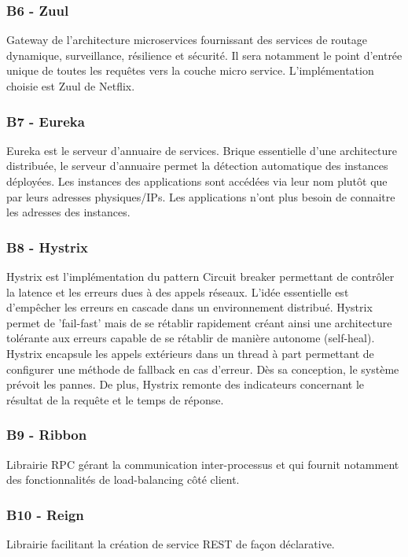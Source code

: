 	\subsubsection{B6 - Zuul}
	Gateway de l’architecture microservices fournissant des services de routage dynamique, surveillance, résilience et sécurité. Il sera notamment le point d’entrée unique de toutes les requêtes vers la couche micro service. L’implémentation choisie est Zuul de Netflix.
	
	\subsubsection{B7 - Eureka}
	Eureka est le serveur d’annuaire de services. Brique essentielle d'une architecture distribuée, le serveur d'annuaire permet la détection automatique des instances déployées. Les instances des applications sont accédées via leur nom plutôt que par leurs adresses physiques/IPs. Les applications n'ont plus besoin de connaitre les adresses des instances.
	
	\subsubsection{B8 - Hystrix}
	Hystrix est l'implémentation du pattern Circuit breaker permettant de contrôler la latence et les erreurs dues à des appels réseaux. L'idée essentielle est d'empêcher les erreurs en cascade dans un environnement distribué. Hystrix permet de 'fail-fast' mais de se rétablir rapidement créant ainsi une architecture tolérante aux erreurs capable de se rétablir de manière autonome (self-heal). Hystrix encapsule les appels extérieurs dans un thread à part permettant de configurer une méthode de fallback en cas d'erreur. Dès sa conception, le système prévoit les pannes.
De plus, Hystrix remonte des indicateurs concernant le résultat de la requête et le temps de réponse.

	\subsubsection{B9 - Ribbon}
	Librairie RPC gérant la communication inter-processus et qui fournit notamment des fonctionnalités de load-balancing côté client.
	
	\subsubsection{B10 - Reign}
	Librairie facilitant la création de service REST de façon déclarative.
	

